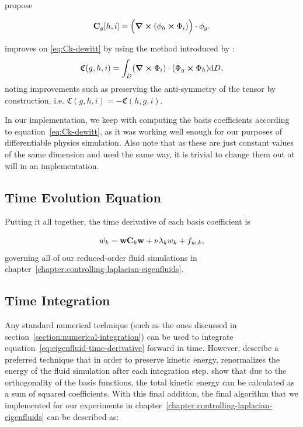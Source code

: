 \cite{dewitt} propose 

\begin{equation}\label{eq:Ck-dewitt}
\vb{C}_g[h, i] = \Big( \curl(\phi_h \cross \Phi_i)\Big)\cdot \phi_g.
\end{equation}

\cite{scalable-eigenfluids} improves on \eqref{eq:Ck-dewitt} by using the method
introduced by \cite{ModelReductionFluidSim}:
\begin{equation}
    \mathfrak{C}(g,h,i) = \int_D (\curl{\Phi_i})\cdot (\Phi_g \cross \Phi_h)
    \text{d}D,
\end{equation}
noting improvements such as preserving the anti-symmetry of the tensor by
construction, i.e. $\mathfrak{C}(g,h,i) = -\mathfrak{C}(h,g,i)$. 

In our implementation, we keep with computing the basis coefficients according
to equation~\eqref{eq:Ck-dewitt}, as it was working well enough for our purposes
of differentiable physics simulation. Also note that as these are just constant
values of the same dimension and used the same way, it is trivial to change them
out at will in an implementation.

\subsection*{Time Evolution Equation}
Putting it all together, the time derivative of each basis coefficient is

\begin{equation}
    \dot{w_k} = \vb{w}\vb{C}_k\vb{w} + \nu \lambda_k w_k + f_{w,k},
\label{eq:eigenfluid-time-derivative}
\end{equation}
governing all of our reduced-order fluid simulations in
chapter~\ref{chapter:controlling-laplacian-eigenfluids}.

\subsection*{Time Integration} 
Any standard numerical technique (such as the ones discussed in
section~\ref{section:numerical-integration}) can be used to integrate
equation~\eqref{eq:eigenfluid-time-derivative} forward in time. However,
\cite{dewitt} describe a preferred technique that in order to preserve kinetic
energy, renormalizes the energy of the fluid simulation after each integration
step. \cite{dewitt} show that due to the orthogonality of the basis functions,
the total kinetic energy can be calculated as a sum of squared coefficients.
With this final addition, the final algorithm that we implemented for our
experiments in chapter~\ref{chapter:controlling-laplacian-eigenfluids} can be
described as:

